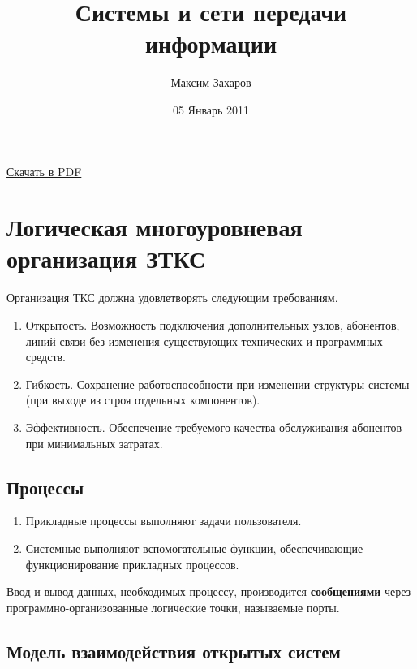 \documentclass[12pt, russian, oneside, article]{ncc}
\begin{document}
\title{Системы и сети передачи информации}
\author{Максим Захаров}
\date{05 Январь 2011}
\maketitle

\setcounter{tocdepth}{3}
\tableofcontents
\vspace*{1cm}

\href{file://~/Documents/Git/lectures/other~/Documents/Git/zamal.github.com/pdf/SiSPI_Lectures.pdf}{Скачать в PDF}

\section{Логическая многоуровневая организация ЗТКС}
\label{sec-1}


Организация ТКС должна удовлетворять следующим требованиям.
\begin{enumerate}
\item Открытость. Возможность подключения дополнительных узлов, абонентов, линий связи без изменения существующих технических и программных средств.
\item Гибкость. Сохранение работоспособности при изменении структуры системы (при выходе из строя отдельных компонентов).
\item Эффективность. Обеспечение требуемого качества обслуживания абонентов при минимальных затратах.
\end{enumerate}
  
\subsection{Процессы}
\label{sec-1_1}


\begin{enumerate}
\item Прикладные процессы выполняют задачи пользователя.
\item Системные выполняют вспомогательные функции, обеспечивающие функционирование прикладных процессов.
\end{enumerate}

Ввод и вывод данных, необходимых процессу, производится \textbf{сообщениями} через программно-организованные логические точки, называемые порты.
\subsection{Модель взаимодействия открытых систем}
\label{sec-1_2}
\end{document}
